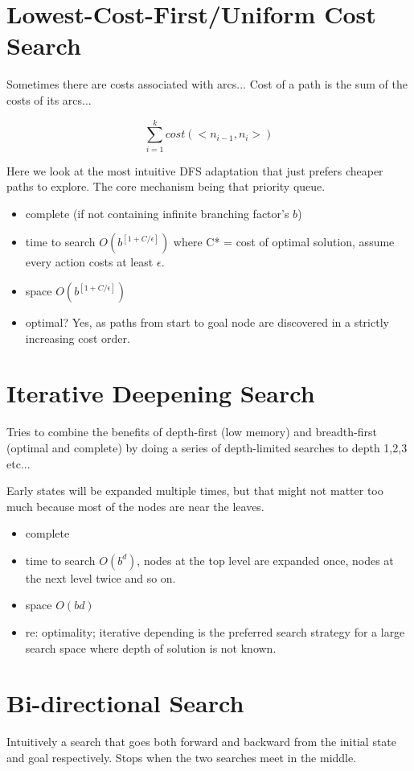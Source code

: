 \documentclass{article}
\begin{document}
\section{Lowest-Cost-First/Uniform Cost Search}
Sometimes there are costs associated with arcs... Cost of a path is the sum of the costs of its arcs...

\begin{equation}
	\sum_{i=1}^{k} cost(<n_{i-1}, n_i>)
\end{equation}

Here we look at the most intuitive DFS adaptation that just prefers cheaper paths to explore. The core mechanism being that priority queue.

\begin{itemize}
	\item complete (if not containing infinite branching factor's $b$)
	\item time to search $O(b^{[1 + C / \epsilon]})$ where C* = cost of optimal solution, assume every action costs at least $\epsilon$.
	\item space $O(b^{[1 + C / \epsilon]})$
	\item optimal? Yes, as paths from start to goal node are discovered in a strictly increasing cost order. 
\end{itemize}

\section{Iterative Deepening Search}
Tries to combine the benefits of depth-first (low memory) and breadth-first (optimal and complete) by doing a series of depth-limited searches to depth 1,2,3 etc...

Early states will be expanded multiple times, but that might not matter too much because most of the nodes are near the leaves.

\begin{itemize}
	\item complete
	\item time to search $O(b^d)$, nodes at the top level are expanded once, nodes at the next level twice and so on. 
	\item space $O(bd)$
	\item re: optimality; iterative depending is the preferred search strategy for a large search space where depth of solution is not known.
\end{itemize}

\section{Bi-directional Search}
Intuitively a search that goes both forward and backward from the initial state and goal respectively. Stops when the two searches meet in the middle.
\end{document}
